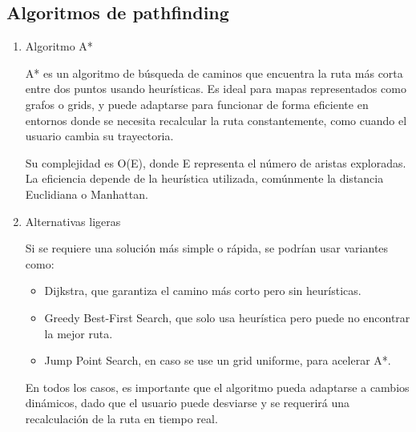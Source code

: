 \documentclass{article}
\begin{document}
\subsection{Algoritmos de pathfinding}
\begin{enumerate}[label=\thesubsection.\arabic*]
    \item Algoritmo A*  
        
    A* es un algoritmo de búsqueda de caminos que encuentra la ruta más corta entre dos puntos usando heurísticas. Es ideal para mapas representados como grafos o grids, y puede adaptarse para funcionar de forma eficiente en entornos donde se necesita recalcular la ruta constantemente, como cuando el usuario cambia su trayectoria.

    Su complejidad es O(E), donde E representa el número de aristas exploradas. La eficiencia depende de la heurística utilizada, comúnmente la distancia Euclidiana o Manhattan.

    \item Alternativas ligeras
    
    Si se requiere una solución más simple o rápida, se podrían usar variantes como:
	
    \begin{itemize}
        \item Dijkstra, que garantiza el camino más corto pero sin heurísticas.
        \item Greedy Best-First Search, que solo usa heurística pero puede no encontrar la mejor ruta.
        \item Jump Point Search, en caso se use un grid uniforme, para acelerar A*.
    \end{itemize}

    En todos los casos, es importante que el algoritmo pueda adaptarse a cambios dinámicos, dado que el usuario puede desviarse y se requerirá una recalculación de la ruta en tiempo real.
\end{enumerate}
\end{document}
